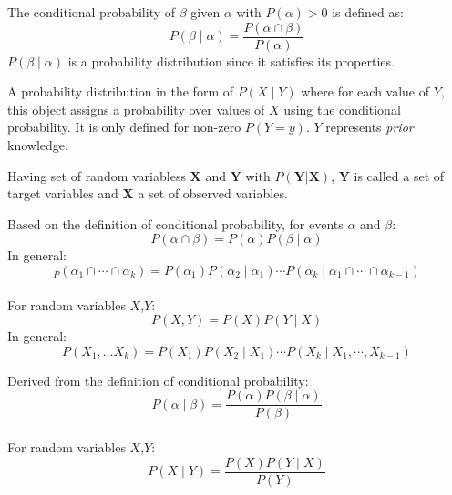 {%
  The conditional probability of $\beta$ given $\alpha$ with $P(\alpha)>0$ is defined as:
  \begin{equation*}
    P(\beta\mid\alpha)=\frac{P(\alpha\cap\beta)}{P(\alpha)}
  \end{equation*}
  $P(\beta\mid\alpha)$ is a \gls{probability distribution} since it satisfies its properties.
}

{%
  A \gls{probability distribution} in the form of $P(X\mid Y)$ where for each value of $Y$, this object assigns a probability over values of $X$ using the \gls{conditional probability}. It is only defined for non-zero $P(Y=y)$. $Y$ represents \textit{prior} knowledge.

  Having \glspl{set of random variables} $\bm{X}$ and $\bm{Y}$ with $P(\bm{Y}|\bm{X})$, $\bm{Y}$ is called a set of \glspl{target variable} and $\bm{X}$ a set of \glspl{observed variable}.
}


{%
  Based on the definition of \gls{conditional probability}, for events $\alpha$ and $\beta$:
  \begin{equation*}
    P(\alpha\cap\beta)=P(\alpha)P(\beta\mid\alpha)
  \end{equation*}
  In general:
  \begin{equation*}
    _P(\alpha_1\cap\cdots\cap\alpha_k)=P(\alpha_1)P(\alpha_2\mid\alpha_1)\cdots P(\alpha_k\mid\alpha_1\cap\cdots\cap\alpha_{k-1})
  \end{equation*}\\[0.1cm]
  For \glspl{random variable} $X$,$Y$:
  \begin{equation*}
    P(X,Y)=P(X)P(Y\mid X)
  \end{equation*}
  In general:
  \begin{equation*}
    P(X_1,\dots X_k)=P(X_1)P(X_2\mid X_1)\cdots P(X_k\mid X_1,\cdots,X_{k-1})
  \end{equation*}

}

{%
  Derived from the definition of \gls{conditional probability}:
  \begin{equation*}
    P(\alpha\mid\beta)=\frac{P(\alpha)P(\beta\mid\alpha)}{P(\beta)}
  \end{equation*}\\[0.1cm]

  For \glspl{random variable} $X$,$Y$:
  \begin{equation*}
    P(X\mid Y)=\frac{P(X)P(Y\mid X)}{P(Y)}
  \end{equation*}
}

